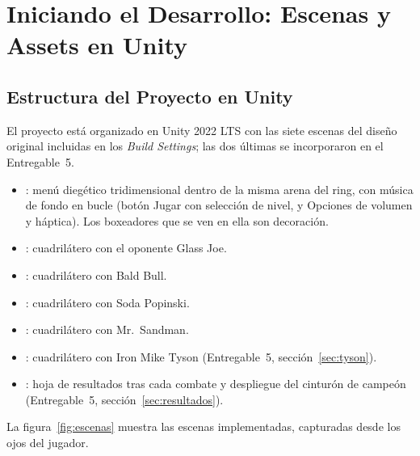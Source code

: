 \section{Iniciando el Desarrollo: Escenas y Assets en Unity}
\subsection{Estructura del Proyecto en Unity}
\label{sec:estructura}
El proyecto está organizado en Unity 2022 LTS con las siete escenas del diseño original incluidas en los \emph{Build Settings}; las dos últimas se incorporaron en el Entregable~5.

\begin{itemize}
  \item {}: menú diegético tridimensional dentro de la misma arena del ring, con música de fondo en bucle (botón Jugar con selección de nivel, y Opciones de volumen y háptica). Los boxeadores que se ven en ella son decoración.
  \item {}: cuadrilátero con el oponente Glass Joe.
  \item {}: cuadrilátero con Bald Bull.
  \item {}: cuadrilátero con Soda Popinski.
  \item {}: cuadrilátero con Mr.\ Sandman.
  \item {}: cuadrilátero con Iron Mike Tyson (Entregable~5, sección~\ref{sec:tyson}).
  \item {}: hoja de resultados tras cada combate y despliegue del cinturón de campeón (Entregable~5, sección~\ref{sec:resultados}).
\end{itemize}

La figura~\ref{fig:escenas} muestra las escenas implementadas, capturadas desde los ojos del jugador.

